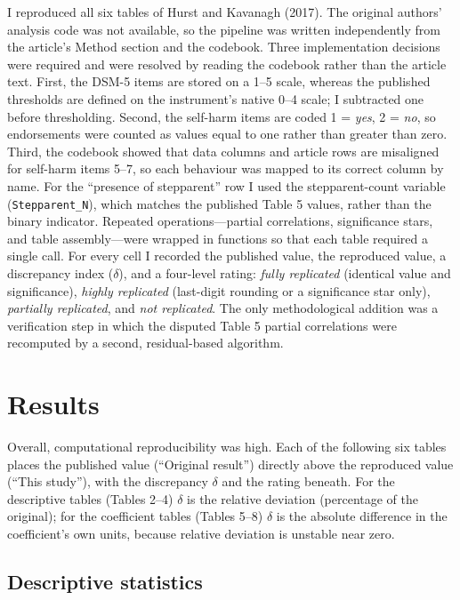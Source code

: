 \documentclass[
  english,
  man,floatsintext]{apa6}
\begin{document}
I reproduced all six tables of Hurst and Kavanagh (2017). The original authors' analysis code was not available, so the pipeline was written independently from the article's Method section and the codebook. Three implementation decisions were required and were resolved by reading the codebook rather than the article text. First, the DSM-5 items are stored on a 1--5 scale, whereas the published thresholds are defined on the instrument's native 0--4 scale; I subtracted one before thresholding. Second, the self-harm items are coded 1 = \emph{yes}, 2 = \emph{no}, so endorsements were counted as values equal to one rather than greater than zero. Third, the codebook showed that data columns and article rows are misaligned for self-harm items 5--7, so each behaviour was mapped to its correct column by name. For the ``presence of stepparent'' row I used the stepparent-count variable (\texttt{Stepparent\_N}), which matches the published Table 5 values, rather than the binary indicator. Repeated operations---partial correlations, significance stars, and table assembly---were wrapped in functions so that each table required a single call. For every cell I recorded the published value, the reproduced value, a discrepancy index (\(\delta\)), and a four-level rating: \emph{fully replicated} (identical value and significance), \emph{highly replicated} (last-digit rounding or a significance star only), \emph{partially replicated}, and \emph{not replicated}. The only methodological addition was a verification step in which the disputed Table 5 partial correlations were recomputed by a second, residual-based algorithm.

\section{Results}\label{results}

Overall, computational reproducibility was high. Each of the following six tables places the published value (``Original result'') directly above the reproduced value (``This study''), with the discrepancy \(\delta\) and the rating beneath. For the descriptive tables (Tables 2--4) \(\delta\) is the relative deviation (percentage of the original); for the coefficient tables (Tables 5--8) \(\delta\) is the absolute difference in the coefficient's own units, because relative deviation is unstable near zero.

\subsection{Descriptive statistics}\label{descriptive-statistics}
\end{document}
